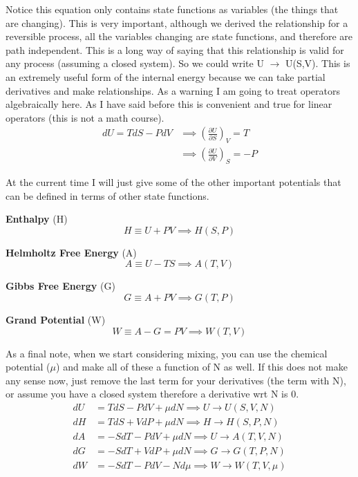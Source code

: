\documentclass{article}
\begin{document}
Notice this equation only contains state functions as variables (the things that are changing).
This is very important, although we derived the relationship for a reversible process, all the variables changing are state functions, and therefore are path independent. 
This is a long way of saying that this relationship is valid for any process (assuming a closed system). 
So we could write U $\rightarrow$ U(S,V). 
This is an extremely useful form of the internal energy because we can take partial derivatives and make relationships. 
As a warning I am going to treat operators algebraically here.
As I have said before this is convenient and true for linear operators (this is not a math course).
\begin{equation}
\begin{split}
    dU = TdS - PdV &\implies \left( \frac{\partial U}{\partial S}  \right)_V = T \\
       &\implies \left( \frac{\partial U}{\partial V}  \right)_S = -P
\end{split}
\end{equation}

At the current time I will just give some of the other important potentials that can be defined in terms of other state functions. 

\textbf{Enthalpy} (H)
\begin{equation}
H \equiv U + PV \implies H(S,P)
\end{equation}

\textbf{Helmholtz Free Energy} (A)
\begin{equation}
A \equiv U - TS \implies A(T,V)
\end{equation}

\textbf{Gibbs Free Energy} (G)
\begin{equation}
G \equiv A + PV \implies G(T,P)
\end{equation}

\textbf{Grand Potential} (W)
\begin{equation}
W \equiv A - G = PV \implies W(T,V)
\end{equation}

As a final note, when we start considering mixing, you can use the chemical potential ($\mu$) and make all of these a function of N as well.
If this does not make any sense now, just remove the last term for your derivatives (the term with N), or assume you have a closed system therefore a derivative wrt N is 0. 
\begin{equation}
\begin{split}
    dU &= TdS - PdV + \mu dN \implies U\rightarrow U(S,V,N) \\
    dH &= TdS + VdP + \mu dN \implies H\rightarrow H(S,P,N)\\
    dA &= -SdT - PdV + \mu dN \implies U\rightarrow A(T,V,N)\\
    dG &= -SdT + VdP + \mu dN \implies G\rightarrow G(T,P,N)\\
    dW &= -SdT - PdV - Nd\mu \implies W\rightarrow W(T,V,\mu)
\end{split}
\end{equation}
\end{document}
